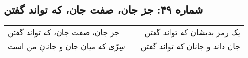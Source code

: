 \begin{center}
\section*{شماره ۴۹: جز جان، صفت جان، که تواند گفتن}
\label{sec:049}
\begin{longtable}{l p{0.5cm} r}
جز جان، صفت جان، که تواند گفتن
&&
یک رمز بدیشان که تواند گفتن
\\
سِرّی که میان جان و جانانِ من است
&&
جان داند و جانان که تواند گفتن
\\
\end{longtable}
\end{center}
